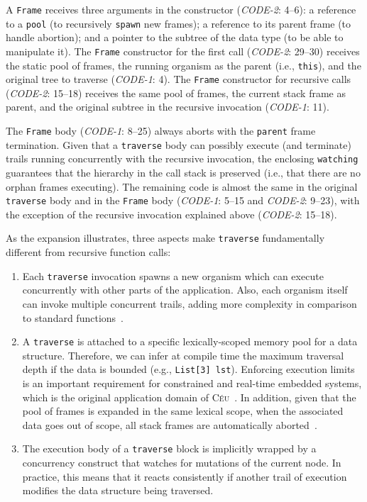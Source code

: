 \documentclass{sig-alternate}
\newcommand{\CEU}{\textsc{C\'{e}u}\xspace}
\newcommand{\code}[1] {{\small{\texttt{#1}}}}
\begin{document}
A \code{Frame} receives three arguments in the constructor (\emph{CODE-2}: 
4--6):
a reference to a \code{pool} (to recursively \code{spawn} new frames);
a reference to its parent frame (to handle abortion);
and a pointer to the subtree of the data type (to be able to manipulate it).
%
The \code{Frame} constructor for the first call (\emph{CODE-2}: 29--30) 
receives the static pool of frames, the running organism as the parent (i.e., 
\code{this}), and the original tree to traverse (\emph{CODE-1}: 4).
%
The \code{Frame} constructor for recursive calls (\emph{CODE-2}: 15--18) 
receives the same pool of frames, the current stack frame as parent, and the 
original subtree in the recursive invocation (\emph{CODE-1}: 11).

The \code{Frame} body (\emph{CODE-1}: 8--25) always aborts with the
\code{parent} frame termination.
Given that a \code{traverse} body can possibly execute (and terminate) trails 
running concurrently with the recursive invocation, the enclosing 
\code{watching} guarantees that the hierarchy in the call stack is preserved 
(i.e., that there are no orphan frames executing).
%
The remaining code is almost the same in the original \code{traverse} body and 
in the \code{Frame} body (\emph{CODE-1}: 5--15 and \emph{CODE-2}: 9--23), with 
the exception of the recursive invocation explained above (\emph{CODE-2}: 
15--18).

As the expansion illustrates, three aspects make \code{traverse} fundamentally 
different from recursive function calls:
%
\begin{enumerate}
\item Each \code{traverse} invocation spawns a new organism which can execute 
concurrently with other parts of the application.
Also, each organism itself can invoke multiple concurrent trails, adding more 
complexity in comparison to standard functions~\cite{ceu.mod15}.
%
\item A \code{traverse} is attached to a specific lexically-scoped memory pool 
for a data structure.
Therefore, we can infer at compile time the maximum traversal depth if the data 
is bounded (e.g., \code{List[3] lst}).
Enforcing execution limits is an important requirement for constrained and 
real-time embedded systems, which is the original application domain of 
\CEU~\cite{ceu.sensys13}.
In addition, given that the pool of frames is expanded in the same lexical 
scope, when the associated data goes out of scope, all stack frames are 
automatically aborted~\cite{ceu.mod15}.
%
\item The execution body of a \code{traverse} block is implicitly wrapped by a 
concurrency construct that watches for mutations of the current node.
In practice, this means that it reacts consistently if another trail of 
execution modifies the data structure being traversed.
\end{enumerate}
\end{document}
